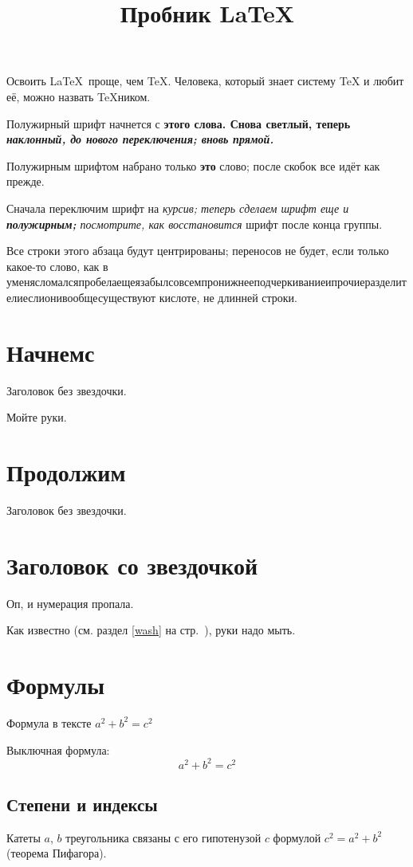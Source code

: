 \documentclass{article}
\title{Пробник \LaTeX}
\begin{document}
\maketitle

Освоить \LaTeX\ проще, чем \TeX. Человека, который знает систему \TeX{} и любит её, можно назвать \TeX ником. 

Полужирный шрифт начнется с \bfseries этого слова.
Снова \mdseries светлый, теперь \slshape наклонный, до нового переключения; вновь \upshape прямой.

Полужирным шрифтом набрано только {\bfseries это} слово; после скобок все идёт как прежде.

Сначала {переключим шрифт на \itshape курсив; теперь сделаем шрифт еще и {\bfseries полужирным;} посмотрите, как восстановится} шрифт после кон{ца г}руппы.

\begin{center}
	Все строки этого абзаца будут центрированы; переносов не будет, если только какое-то слово, как в уменясломалсяпробелаещеязабылсовсемпронижнееподчеркиваниеипрочиеразделителиеслионивообщесуществуют кислоте, не длинней строки.
\end{center}

\section{Начнемс}
Заголовок без звездочки.

Мойте руки.\label{wash}

\section{Продолжим}
Заголовок без звездочки.

\section*{Заголовок со звездочкой}

Оп, и нумерация пропала.

Как известно (см. раздел \ref{wash} на стр.~\pageref{wash}), руки надо мыть.

\section{Формулы}
Формула в тексте $a^2+b^2=c^2$

Выключная формула:
\[
a^2+b^2=c^2
\]

\subsection{Степени и индексы}
Катеты $a$, $b$ треугольника связаны с его гипотенузой $c$ формулой $c^2=a^2+b^2$ (теорема Пифагора).
\end{document}
